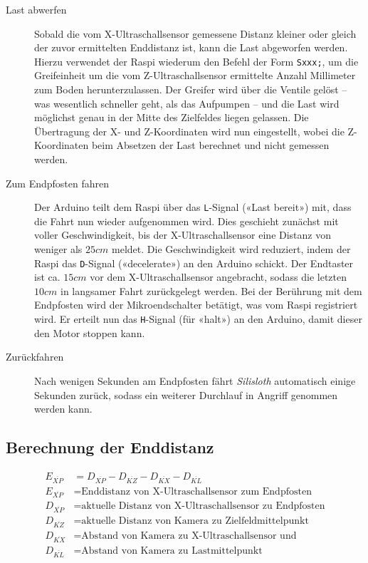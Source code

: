 \begin{description}
    \item[Last abwerfen] Sobald die vom X-Ultraschallsensor gemessene Distanz kleiner oder gleich der zuvor ermittelten Enddistanz ist, kann die Last abgeworfen werden. Hierzu verwendet der Raspi wiederum den Befehl der Form \texttt{Sxxx;}, um die Greifeinheit um die vom Z-Ultraschallsensor ermittelte Anzahl Millimeter zum Boden herunterzulassen. Der Greifer wird über die Ventile gelöst -- was wesentlich schneller geht, als das Aufpumpen -- und die Last wird möglichst genau in der Mitte des Zielfeldes liegen gelassen. Die Übertragung der X- und Z-Koordinaten wird nun eingestellt, wobei die Z-Koordinaten beim Absetzen der Last berechnet und nicht gemessen werden.
    \item[Zum Endpfosten fahren] Der Arduino teilt dem Raspi über das \texttt{L}-Signal («Last bereit») mit, dass die Fahrt nun wieder aufgenommen wird. Dies geschieht zunächst mit voller Geschwindigkeit, bis der X-Ultraschallsensor eine Distanz von weniger als $25cm$ meldet. Die Geschwindigkeit wird reduziert, indem der Raspi das \texttt{D}-Signal («decelerate») an den Arduino schickt. Der Endtaster ist ca. $15cm$ vor dem X-Ultraschallsensor angebracht, sodass die letzten $10cm$ in langsamer Fahrt zurückgelegt werden. Bei der Berührung mit dem Endpfosten wird der Mikroendschalter betätigt, was vom Raspi registriert wird. Er erteilt nun das \texttt{H}-Signal (für «halt») an den Arduino, damit dieser den Motor stoppen kann.
    \item[Zurückfahren] Nach wenigen Sekunden am Endpfosten fährt \textit{Silisloth} automatisch einige Sekunden zurück, sodass ein weiterer Durchlauf in Angriff genommen werden kann.
\end{description}

\subsection{Berechnung der Enddistanz}

\begin{align}
    E_{\overline{XP}} &= D_{\overline{XP}}-D_{\overline{KZ}}-D_{\overline{KX}}-D_{\overline{KL}} \label{eq:enddistanz} \\
    E_{\overline{XP}} &= \text{Enddistanz von X-Ultraschallsensor zum Endpfosten} \nonumber \\
    D_{\overline{XP}} &= \text{aktuelle Distanz von X-Ultraschallsensor zu Endpfosten} \nonumber \\
    D_{\overline{KZ}} &= \text{aktuelle Distanz von Kamera zu Zielfeldmittelpunkt} \nonumber \\
    D_{\overline{KX}} &= \text{Abstand von Kamera zu X-Ultraschallsensor und} \nonumber \\
    D_{\overline{KL}} &= \text{Abstand von Kamera zu Lastmittelpunkt} \nonumber
\end{align}

